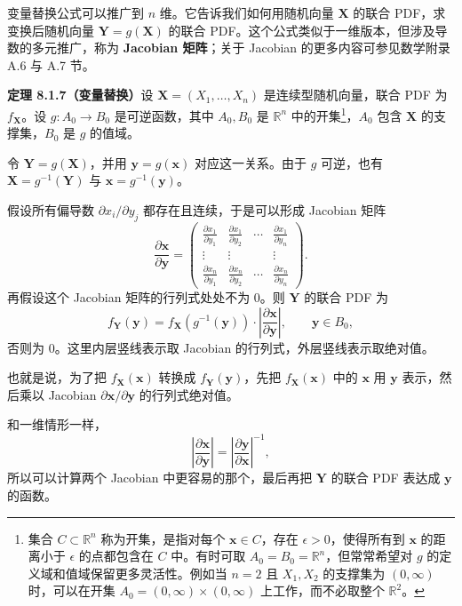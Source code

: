 \documentclass[UTF8,12pt,a4paper,fontset=fandol]{ctexart}
\begin{document}
变量替换公式可以推广到 $n$ 维。它告诉我们如何用随机向量 $\mathbf X$ 的联合 PDF，求变换后随机向量 $\mathbf Y=g(\mathbf X)$ 的联合 PDF。这个公式类似于一维版本，但涉及导数的多元推广，称为 \textbf{Jacobian 矩阵}；关于 Jacobian 的更多内容可参见数学附录 A.6 与 A.7 节。

\noindent\textbf{定理 8.1.7（变量替换）}\quad 设 $\mathbf X=(X_1,\ldots,X_n)$ 是连续型随机向量，联合 PDF 为 $f_{\mathbf X}$。设 $g:A_0\to B_0$ 是可逆函数，其中 $A_0,B_0$ 是 $\mathbb R^n$ 中的开集\footnote{集合 $C\subset\mathbb R^n$ 称为开集，是指对每个 $\mathbf x\in C$，存在 $\epsilon>0$，使得所有到 $\mathbf x$ 的距离小于 $\epsilon$ 的点都包含在 $C$ 中。有时可取 $A_0=B_0=\mathbb R^n$，但常常希望对 $g$ 的定义域和值域保留更多灵活性。例如当 $n=2$ 且 $X_1,X_2$ 的支撑集为 $(0,\infty)$ 时，可以在开集 $A_0=(0,\infty)\times(0,\infty)$ 上工作，而不必取整个 $\mathbb R^2$。}，$A_0$ 包含 $\mathbf X$ 的支撑集，$B_0$ 是 $g$ 的值域。

令 $\mathbf Y=g(\mathbf X)$，并用 $\mathbf y=g(\mathbf x)$ 对应这一关系。由于 $g$ 可逆，也有 $\mathbf X=g^{-1}(\mathbf Y)$ 与 $\mathbf x=g^{-1}(\mathbf y)$。

假设所有偏导数 $\partial x_i/\partial y_j$ 都存在且连续，于是可以形成 Jacobian 矩阵
\[
  \frac{\partial \mathbf x}{\partial \mathbf y}
  =
  \begin{pmatrix}
    \frac{\partial x_1}{\partial y_1} & \frac{\partial x_1}{\partial y_2} & \cdots & \frac{\partial x_1}{\partial y_n}\\
    \vdots & \vdots & & \vdots\\
    \frac{\partial x_n}{\partial y_1} & \frac{\partial x_n}{\partial y_2} & \cdots & \frac{\partial x_n}{\partial y_n}
  \end{pmatrix}.
\]
再假设这个 Jacobian 矩阵的行列式处处不为 $0$。则 $\mathbf Y$ 的联合 PDF 为
\[
  f_{\mathbf Y}(\mathbf y)
  =
  f_{\mathbf X}\left(g^{-1}(\mathbf y)\right)
  \cdot
  \left|\frac{\partial \mathbf x}{\partial \mathbf y}\right|,
  \qquad \mathbf y\in B_0,
\]
否则为 $0$。这里内层竖线表示取 Jacobian 的行列式，外层竖线表示取绝对值。

也就是说，为了把 $f_{\mathbf X}(\mathbf x)$ 转换成 $f_{\mathbf Y}(\mathbf y)$，先把 $f_{\mathbf X}(\mathbf x)$ 中的 $\mathbf x$ 用 $\mathbf y$ 表示，然后乘以 Jacobian $\partial\mathbf x/\partial\mathbf y$ 的行列式绝对值。

和一维情形一样，
\[
  \left|\frac{\partial\mathbf x}{\partial\mathbf y}\right|
  =
  \left|\frac{\partial\mathbf y}{\partial\mathbf x}\right|^{-1},
\]
所以可以计算两个 Jacobian 中更容易的那个，最后再把 $\mathbf Y$ 的联合 PDF 表达成 $\mathbf y$ 的函数。
\end{document}
